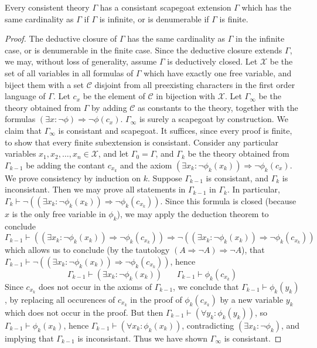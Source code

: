 \begin{lemma}
    Every consistent theory $\Gamma$ has a consistant scapegoat extension $\Gamma$ which has the same cardinality as $\Gamma$ if $\Gamma$ is infinite, or is denumerable if $\Gamma$ is finite.
\end{lemma}
\begin{proof}
    The deductive closure of $\Gamma$ has the same cardinality as $\Gamma$ in the infinite case, or is denumerable in the finite case. Since the deductive closure extends $\Gamma$, we may, without loss of generality, assume $\Gamma$ is deductively closed. Let $\mathcal{X}$ be the set of all variables in all formulas of $\Gamma$ which have exactly one free variable, and biject them with a set $\mathcal{C}$ disjoint from all preexisting characters in the first order language of $\Gamma$. Let $c_x$ be the element of $\mathcal{C}$ in bijection with $\mathcal{X}$. Let $\Gamma_\infty$ be the theory obtained from $\Gamma$ by adding $\mathcal{C}$ as constants to the theory, together with the formulas $(\exists x: \neg \phi) \Rightarrow \neg \phi(c_x)$. $\Gamma_\infty$ is surely a scapegoat by construction. We claim that $\Gamma_\infty$ is consistant and scapegoat. It suffices, since every proof is finite, to show that every finite subextension is consistant. Consider any particular variables $x_1, x_2, \dots, x_n \in \mathcal{X}$, and let $\Gamma_0 = \Gamma$, and $\Gamma_k$ be the theory obtained from $\Gamma_{k-1}$ be adding the contant $c_{x_k}$ and the axiom $(\exists x_k: \neg \phi_k(x_k)) \Rightarrow \neg \phi_k(c_x)$. We prove consistency by induction on $k$. Suppose $\Gamma_{k-1}$ is consistant, and $\Gamma_k$ is inconsistant. Then we may prove all statements in $\Gamma_{k-1}$ in $\Gamma_k$. In particular, $\Gamma_k \vdash \neg ((\exists x_k: \neg \phi_k(x_k)) \Rightarrow \neg \phi_k(c_{x_k}))$. Since this formula is closed (because $x$ is the only free variable in $\phi_k$), we may apply the deduction theorem to conclude
    \[ \Gamma_{k-1} \vdash ((\exists x_k: \neg \phi_k(x_k)) \Rightarrow \neg \phi_k(c_{x_k})) \Rightarrow \neg ((\exists x_k: \neg \phi_k(x_k)) \Rightarrow \neg \phi_k(c_{x_k})) \]
    which allows us to conclude (by the tautology $(A \Rightarrow \neg A) \Rightarrow \neg A$), that $\Gamma_{k-1} \vdash \neg ((\exists x_k: \neg \phi_k(x_k)) \Rightarrow \neg \phi_k(c_{x_k}))$, hence
    \[ \Gamma_{k-1} \vdash (\exists x_k: \neg \phi_k(x_k))\ \ \ \ \ \ \ \ \Gamma_{k-1} \vdash \phi_k(c_{x_k}) \]
    Since $c_{x_k}$ does not occur in the axioms of $\Gamma_{k-1}$, we conclude that $\Gamma_{k-1} \vdash \phi_k(y_k)$, by replacing all occurences of $c_{x_k}$ in the proof of $\phi_k(c_{x_k})$ by a new variable $y_k$ which does not occur in the proof. But then $\Gamma_{k-1} \vdash (\forall y_k: \phi_k(y_k))$, so $\Gamma_{k-1} \vdash \phi_k(x_k)$, hence $\Gamma_{k-1} \vdash (\forall x_k: \phi_k(x_k))$, contradicting $(\exists x_k: \neg \phi_k)$, and implying that $\Gamma_{k-1}$ is inconsistant. Thus we have shown $\Gamma_\infty$ is consistant.
\end{proof}

